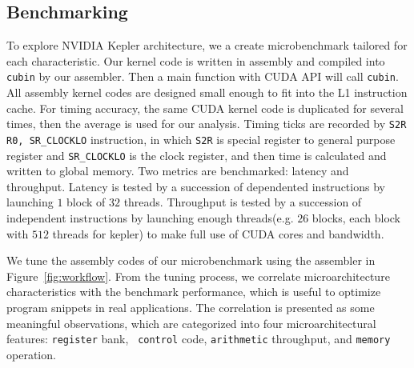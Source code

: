 \subsection{Benchmarking} %
\label{sec:benchmark}


To explore NVIDIA Kepler architecture, we a create microbenchmark tailored for each characteristic.
Our kernel code is  written in assembly and compiled into {\tt cubin} by our assembler. Then a main function with CUDA API
will call {\tt cubin}.
All assembly kernel codes are designed small enough to fit into the L1 instruction cache.
For timing accuracy, the same CUDA kernel code is duplicated for several times, then the average is used for our analysis.
Timing ticks are recorded by {\tt S2R R0, SR\_CLOCKLO} instruction, in which {\tt S2R} is special register to general
purpose register and  {\tt SR\_CLOCKLO} is the clock register,
and then time is calculated and written to global memory.
Two metrics are benchmarked: latency and throughput. Latency is tested by a succession of dependented instructions by
launching $1$ block of $32$ threads. Throughput is tested by a succession of independent instructions by launching enough
threads(e.g. $26$ blocks, each block with $512$ threads for kepler) to make full use of CUDA cores and bandwidth.

We tune the assembly codes of our microbenchmark using the assembler in Figure~\ref{fig:workflow}.
From the tuning process, we correlate microarchitecture characteristics with the benchmark performance, which is useful
to optimize program snippets in real applications.
The correlation is presented as some meaningful observations, which are categorized into four microarchitectural features:  {\tt register} bank, {\tt
control} code,  {\tt arithmetic} throughput, and {\tt memory} operation.


